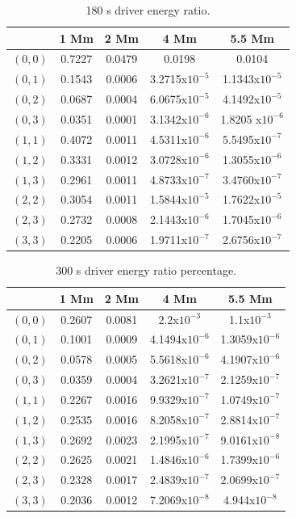 \documentclass[preprint,authoryear,12pt]{elsarticle}
\begin{document}
\begin{table}[h]
\centering
\begin{tabular}{c c c c c }
\hline
   &  1 Mm & 2 Mm & 4 Mm & 5.5 Mm \\
\hline
$(0, 0)$ &  0.7227 & 0.0479 & 0.0198 & 0.0104 \\
\hline
$(0, 1)$ & 0.1543 & 0.0006 & 3.2715x$10^{-5}$ &  1.1343x$10^{-5}$\\
\hline
$(0, 2)$ & 0.0687 & 0.0004 & 6.0675x$10^{-5}$ &  4.1492x$10^{-5}$\\
\hline
$(0, 3)$ & 0.0351 & 0.0001 & 3.1342x$10^{-6}$ & 1.8205 x$10^{-6}$\\
\hline
$(1, 1)$ & 0.4072 & 0.0011 & 4.5311x$10^{-6}$ &  5.5495x$10^{-7}$\\
\hline
$(1, 2)$ & 0.3331 & 0.0012 & 3.0728x$10^{-6}$ &  1.3055x$10^{-6}$\\
\hline
$(1, 3)$ & 0.2961 & 0.0011 & 4.8733x$10^{-7}$ &  3.4760x$10^{-7}$\\
\hline
$(2, 2)$ & 0.3054 & 0.0011 & 1.5844x$10^{-5}$ &  1.7622x$10^{-5}$\\
\hline
$(2, 3)$ & 0.2732 & 0.0008 & 2.1443x$10^{-6}$ &  1.7045x$10^{-6}$\\
\hline
$(3, 3)$ & 0.2205 & 0.0006 & 1.9711x$10^{-7}$ &  2.6756x$10^{-7}$\\
\hline
\end{tabular} 
\caption{180 s driver energy ratio.}
\label{Table180}
\end{table}

\begin{table}[h]
\centering
\begin{tabular}{c c c c c }
\hline
   &  1 Mm & 2 Mm & 4 Mm & 5.5 Mm \\
\hline
$(0, 0)$ &  0.2607 & 0.0081 & 2.2x$10^{-3}$ &  1.1x$10^{-3}$\\
\hline
$(0, 1)$ & 0.1001 & 0.0009 & 4.1494x$10^{-6}$ &  1.3059x$10^{-6}$\\
\hline
$(0, 2)$ & 0.0578 & 0.0005 & 5.5618x$10^{-6}$ &  4.1907x$10^{-6}$\\
\hline
$(0, 3)$ & 0.0359 & 0.0004 &3.2621x$10^{-7}$ &  2.1259x$10^{-7}$\\
\hline
$(1, 1)$ & 0.2267 & 0.0016 & 9.9329x$10^{-7}$ &  1.0749x$10^{-7}$\\
\hline
$(1, 2)$ & 0.2535 & 0.0016 & 8.2058x$10^{-7}$ &  2.8814x$10^{-7}$\\
\hline
$(1, 3)$ & 0.2692 & 0.0023 & 2.1995x$10^{-7}$ &  9.0161x$10^{-8}$\\
\hline
$(2, 2)$ & 0.2625 & 0.0021 & 1.4846x$10^{-6}$ &  1.7399x$10^{-6}$\\
\hline
$(2, 3)$ & 0.2328 & 0.0017 & 2.4839x$10^{-7}$ &  2.0699x$10^{-7}$\\
\hline
$(3, 3)$ & 0.2036 & 0.0012 & 7.2069x$10^{-8}$ &  4.944x$10^{-8}$\\
\hline
\end{tabular} 
\caption{300 s driver energy ratio percentage.}
\label{Table300mode}
\end{table}
\end{document}

